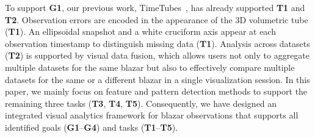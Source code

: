 To support \textbf{G1}, our previous work, TimeTubes~\cite{Fujishiro2018}, has already supported \textbf{T1} and \textbf{T2}.
Observation errors are encoded in the appearance of the 3D volumetric tube (\textbf{T1}).
An ellipsoidal snapshot and a white cruciform axis appear at each observation timestamp to distinguish missing data (\textbf{T1}).
Analysis across datasets (\textbf{T2}) is supported by visual data fusion, which allows users not only to aggregate multiple datasets for the same blazar but also to effectively compare multiple datasets for the same or a different blazar in a single visualization session.
In this paper, we mainly focus on feature and pattern detection methods to support the remaining three tasks (\textbf{T3}, \textbf{T4}, \textbf{T5}).
Consequently, we have designed an integrated visual analytics framework for blazar observations that supports all identified goals (\textbf{G1}--\textbf{G4}) and tasks (\textbf{T1}--\textbf{T5}).
